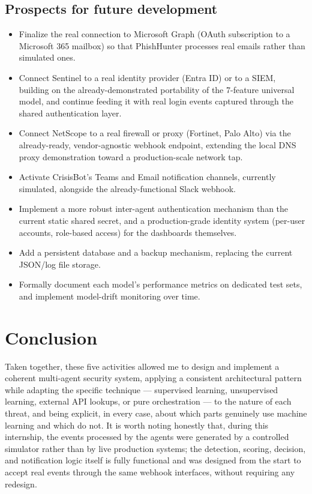 \documentclass[12pt,a4paper]{report}
\begin{document}
\subsection*{Prospects for future development}
\begin{itemize}[nosep]
\item Finalize the real connection to Microsoft Graph (OAuth subscription to a Microsoft 365 mailbox) so that PhishHunter processes real emails rather than simulated ones.
\item Connect Sentinel to a real identity provider (Entra ID) or to a SIEM, building on the already-demonstrated portability of the 7-feature universal model, and continue feeding it with real login events captured through the shared authentication layer.
\item Connect NetScope to a real firewall or proxy (Fortinet, Palo Alto) via the already-ready, vendor-agnostic webhook endpoint, extending the local DNS proxy demonstration toward a production-scale network tap.
\item Activate CrisisBot's Teams and Email notification channels, currently simulated, alongside the already-functional Slack webhook.
\item Implement a more robust inter-agent authentication mechanism than the current static shared secret, and a production-grade identity system (per-user accounts, role-based access) for the dashboards themselves.
\item Add a persistent database and a backup mechanism, replacing the current JSON/log file storage.
\item Formally document each model's performance metrics on dedicated test sets, and implement model-drift monitoring over time.
\end{itemize}

\section*{Conclusion}
Taken together, these five activities allowed me to design and implement a coherent multi-agent security system, applying a consistent architectural pattern while adapting the specific technique --- supervised learning, unsupervised learning, external API lookups, or pure orchestration --- to the nature of each threat, and being explicit, in every case, about which parts genuinely use machine learning and which do not. It is worth noting honestly that, during this internship, the events processed by the agents were generated by a controlled simulator rather than by live production systems; the detection, scoring, decision, and notification logic itself is fully functional and was designed from the start to accept real events through the same webhook interfaces, without requiring any redesign.
\end{document}
